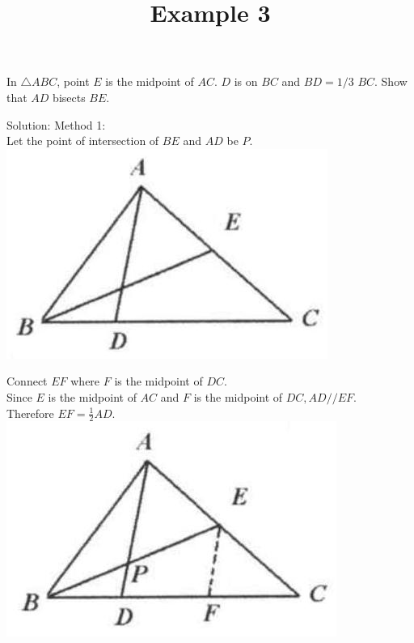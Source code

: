 \documentclass{article}
\title{Example 3}
\date{}
\begin{document}
\maketitle

In \(\triangle A B C\), point \(E\) is the midpoint of \(A C\). \(D\) is on \(B C\) and \(B D=1 / 3\) \(B C\). Show that \(A D\) bisects \(B E\).

Solution:
Method 1:\\
Let the point of intersection of \(B E\) and \(A D\) be \(P\).\\
\centering
\includegraphics[width=\textwidth]{images/036(1).jpg}

Connect \(E F\) where \(F\) is the midpoint of \(D C\).\\
Since \(E\) is the midpoint of \(A C\) and \(F\) is the midpoint of \(D C, A D / / E F\).\\
Therefore \(E F=\frac{1}{2} A D\).\\
\centering
\includegraphics[width=\textwidth]{images/036.jpg}
\end{document}
